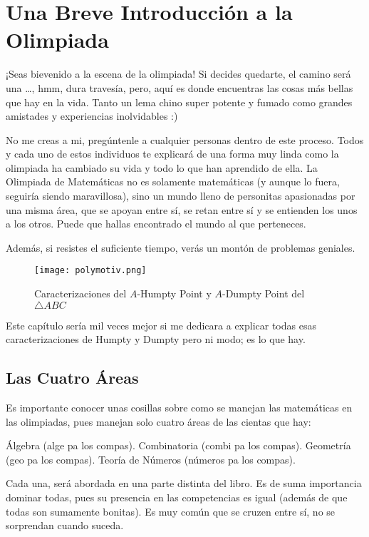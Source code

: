 \chapter{Una Breve Introducción a la Olimpiada}

¡Seas bievenido a la escena de la olimpiada! 
Si decides quedarte, el camino será una \dots, hmm, dura travesía, pero, 
aquí es donde encuentras las cosas más bellas que hay en la vida. 
Tanto un lema chino super potente y fumado como grandes amistades 
y experiencias inolvidables :)

No me creas a mi, pregúntenle a cualquier personas dentro de este proceso. 
Todos y cada uno de estos individuos te explicará de una forma 
muy linda como la olimpiada ha cambiado su vida 
y todo lo que han aprendido de ella. La Olimpiada de Matemáticas no 
es solamente matemáticas (y aunque lo fuera, seguiría siendo maravillosa), 
sino un mundo lleno de personitas apasionadas por una misma área, 
que se apoyan entre sí, se retan entre sí y se entienden los unos a los otros. 
Puede que hallas encontrado el mundo al que perteneces. 

Además, si resistes el suficiente tiempo, 
verás un montón de problemas geniales. 

\begin{figure}[h]
    \centering
    \texttt{[image: polymotiv.png]} 
    \caption{Caracterizaciones del $A$-Humpty Point 
    y $A$-Dumpty Point del $\triangle ABC$}
\end{figure}

Este capítulo sería mil veces mejor si me dedicara a explicar 
todas esas caracterizaciones de Humpty y Dumpty pero ni modo; 
es lo que hay.

\section{Las Cuatro Áreas}

Es importante conocer unas cosillas sobre como se manejan las 
matemáticas en las olimpiadas, pues manejan solo cuatro áreas de las 
cientas que hay:

\begin{itemize}
    \ii Álgebra (alge pa los compas).
    \ii Combinatoria (combi pa los compas).
    \ii Geometría (geo pa los compas).
    \ii Teoría de Números (números pa los compas).
\end{itemize}

Cada una, será abordada en una parte distinta del libro. 
Es de suma importancia dominar todas, pues su presencia 
en las competencias es igual (además de que todas son sumamente bonitas). 
Es muy común que se cruzen entre sí, no se sorprendan cuando suceda.

